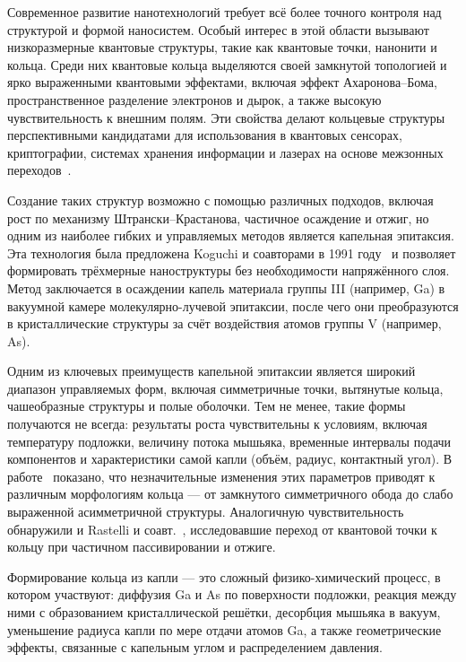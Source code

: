 \documentclass[14pt,oneside]{extarticle}
\begin{document}


\tableofcontents
\pagebreak


Современное развитие нанотехнологий требует всё более точного контроля над структурой и формой наносистем. Особый интерес в этой области вызывают низкоразмерные квантовые структуры, такие как квантовые точки, нанонити и кольца. Среди них квантовые кольца выделяются своей замкнутой топологией и ярко выраженными квантовыми эффектами, включая эффект Ахаронова–Бома, пространственное разделение электронов и дырок, а также высокую чувствительность к внешним полям. Эти свойства делают кольцевые структуры перспективными кандидатами для использования в квантовых сенсорах, криптографии, системах хранения информации и лазерах на основе межзонных переходов~\cite{jin2010}.

Создание таких структур возможно с помощью различных подходов, включая рост по механизму Штрански–Крастанова, частичное осаждение и отжиг, но одним из наиболее гибких и управляемых методов является капельная эпитаксия. Эта технология была предложена Koguchi и соавторами в 1991 году~\cite{koguchi1991} и позволяет формировать трёхмерные наноструктуры без необходимости напряжённого слоя. Метод заключается в осаждении капель материала группы III (например, Ga) в вакуумной камере молекулярно-лучевой эпитаксии, после чего они преобразуются в кристаллические структуры за счёт воздействия атомов группы V (например, As).

Одним из ключевых преимуществ капельной эпитаксии является широкий диапазон управляемых форм, включая симметричные точки, вытянутые кольца, чашеобразные структуры и полые оболочки. Тем не менее, такие формы получаются не всегда: результаты роста чувствительны к условиям, включая температуру подложки, величину потока мышьяка, временные интервалы подачи компонентов и характеристики самой капли (объём, радиус, контактный угол). В работе~\cite{zhou2013} показано, что незначительные изменения этих параметров приводят к различным морфологиям кольца — от замкнутого симметричного обода до слабо выраженной асимметричной структуры. Аналогичную чувствительность обнаружили и Rastelli и соавт.~\cite{rastelli2004}, исследовавшие переход от квантовой точки к кольцу при частичном пассивировании и отжиге.

Формирование кольца из капли — это сложный физико-химический процесс, в котором участвуют: диффузия Ga и As по поверхности подложки, реакция между ними с образованием кристаллической решётки, десорбция мышьяка в вакуум, уменьшение радиуса капли по мере отдачи атомов Ga, а также геометрические эффекты, связанные с капельным углом и распределением давления.
\end{document}
